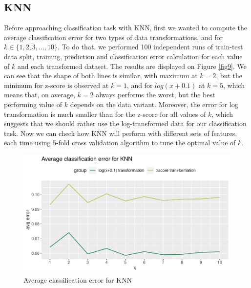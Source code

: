 \documentclass{article}\usepackage[]{graphicx}\usepackage[]{xcolor}
\makeatletter
\def\maxwidth{ %
  \ifdim\Gin@nat@width>\linewidth
    \linewidth
  \else
    \Gin@nat@width
  \fi
}
\newenvironment{knitrout}{}{} %
\makeatother
\begin{document}
\subsection*{KNN}

Before approaching classification task with KNN, first we wanted to compute the average classification error
for two types of data transformations, and for $k \in \{1, 2, 3, \dots, 10\}$.
To do that, we performed 100 independent runs of train-test data split, training, prediction
and classification error calculation for each value of $k$ and each transformed dataset.
The results are displayed on Figure \ref{fig9}. We can see that the shape of both lines is similar,
with maximum at $k=2$, but the minimum for z-score is observed at $k=1$, and for $log(x+0.1)$
at $k=5$, which means that, on average, $k=2$ always performs the worst, but the best performing
value of $k$ depends on the data variant. Moreover, the error for log transformation is much smaller 
than for the z-score for all values of $k$, which suggests that we should rather use the 
log-transformed data for our classification task. Now we can check how KNN will perform with different sets of features,
each time using 5-fold cross validation algorithm to tune the optimal value of $k$.

\begin{knitrout}
\color{fgcolor}\begin{figure}[h]
\includegraphics[width=\maxwidth]{figure/avgErrKNN-1} \caption[\label{fig9} Average classification error for KNN]{\label{fig9} Average classification error for KNN}\label{fig:avgErrKNN}
\end{figure}

\end{knitrout}
\end{document}

